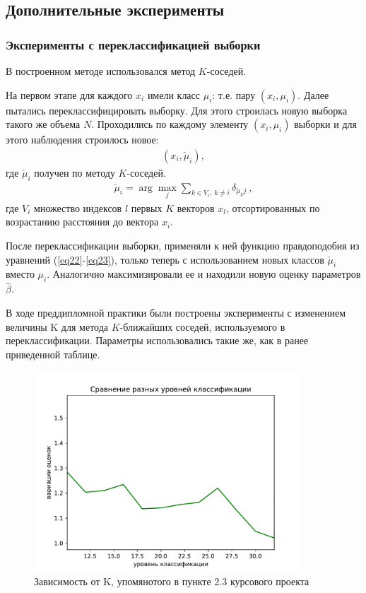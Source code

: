 \newpage
\subsection{Дополнительные эксперименты}
\subsubsection{Эксперименты с переклассификацией выборки}
В построенном методе использовался метод $K$-соседей.

На первом этапе для каждого $x_i$ имели класс $\mu_i$: т.е. пару $(x_i,\mu_i)$.
Далее пытались переклассифицировать выборку. 
Для этого строилась новую выборка такого же объема $N$.
Проходились по каждому элементу $(x_i, \mu_i)$ выборки и для этого наблюдения строилось новое:
\begin{eqnarray}
    (x_i, \check{\mu}_i),
\end{eqnarray}
где $\check{\mu}_i$ получен по методу $K$-соседей.\hfill\break
\begin{eqnarray}
    \check{\mu}_i = \arg\max_j \sum_{k \in V_i,~k\neq i} \delta_{\check{\mu}_k j}~,
\end{eqnarray}
где $V_i$ множество индексов $l$ первых $K$ векторов $x_l$, отсортированных по возрастанию расстояния до вектора $x_i$.

После переклассификации выборки, применяли к ней функцию правдоподобия из уравнений (\ref{eq22}-\ref{eq23}), только теперь с использованием новых классов $\check{\mu}_i$ вместо $\mu_i$. 
Аналогично максимизировали ее и находили новую оценку параметров $\hat{\beta}$.

В ходе преддипломной практики были построены эксперименты с изменением величины K для метода $K$-ближайших соседей, используемого в переклассификации. Параметры использовались такие же, как в ранее приведенной таблице.
\begin{figure}[h!]
    \centering
    \includegraphics[width=100mm]{../images/different_recl_level.pdf}
    \caption{Зависимость от K, упомянотого в пункте 2.3 курсового проекта\label{overflow}}
    \label{pic1}
\end{figure}

